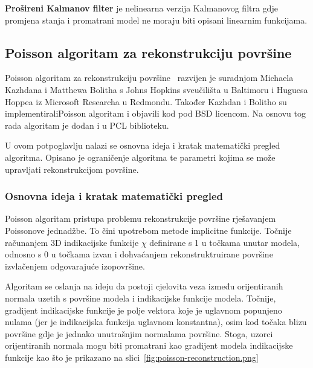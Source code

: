 \textbf{Prošireni Kalmanov filter} je nelinearna verzija Kalmanovog
filtra gdje promjena stanja i promatrani model ne moraju biti opisani
linearnim funkcijama.



\newpage
\subsection{Poisson algoritam za rekonstrukciju površine} %
\label{sub:Poisson}

Poisson algoritam za rekonstrukciju površine~\cite{Kazhdan:2006}
razvijen je suradnjom Michaela Kazhdana i Matthewa Bolitha s Johns
Hopkins sveučilišta u Baltimoru i Huguesa Hoppea iz Microsoft Researcha
u Redmondu. Također Kazhdan i Bolitho su implementirali\footnotemark[1]
Poisson algoritam i objavili kod pod BSD licencom. Na osnovu tog rada
algoritam je dodan i u PCL biblioteku.

U ovom potpoglavlju nalazi se osnovna ideja i kratak matematički pregled
algoritma. Opisano je ograničenje algoritma te parametri kojima se može
upravljati rekonstrukcijom površine.



\subsubsection{Osnovna ideja i kratak matematički pregled} %
\label{ssub:Osnovna ideja i kratak matematički pregled}

Poisson algoritam pristupa problemu rekonstrukcije površine rješavanjem
Poissonove jednadžbe. To čini upotrebom metode implicitne funkcije.
Točnije računanjem 3D indikacijske funkcije \(\chi\) definirane s 1 u
točkama unutar modela, odnosno s 0 u točkama izvan i dohvaćanjem
rekonstruktruirane površine izvlačenjem odgovarajuće izopovršine.

Algoritam se oslanja na ideju da postoji cjelovita veza između
orijentiranih normala uzetih s površine modela i indikacijske funkcije
modela. Točnije, gradijent indikacijske funkcije je polje vektora koje
je uglavnom popunjeno nulama (jer je indikacijska funkcija uglavnom
konstantna), osim kod točaka blizu površine gdje je jednako unutrašnjim
normalama površine. Stoga, uzorci orijentiranih normala mogu biti
promatrani kao gradijent modela indikacijske funkcije kao što je
prikazano na slici~\ref{fig:poisson-reconstruction.png}

